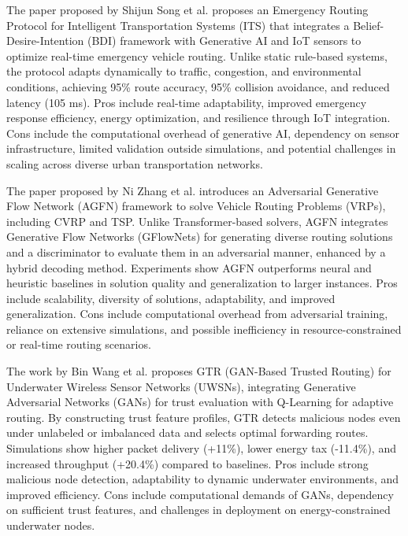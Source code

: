 \documentclass[a4paper,fleqn]{cas-dc}
\numberwithin{equation}{section}
\begin{document}
The paper proposed by Shijun Song et al.\cite{song2025emergency} proposes an Emergency Routing Protocol for Intelligent Transportation Systems (ITS) that integrates a Belief-Desire-Intention (BDI) framework with Generative AI and IoT sensors to optimize real-time emergency vehicle routing. Unlike static rule-based systems, the protocol adapts dynamically to traffic, congestion, and environmental conditions, achieving 95\% route accuracy, 95\% collision avoidance, and reduced latency (105 ms). Pros include real-time adaptability, improved emergency response efficiency, energy optimization, and resilience through IoT integration. Cons include the computational overhead of generative AI, dependency on sensor infrastructure, limited validation outside simulations, and potential challenges in scaling across diverse urban transportation networks. 

The paper proposed by Ni Zhang et al.\cite{zhang2025adversarial} introduces an Adversarial Generative Flow Network (AGFN) framework to solve Vehicle Routing Problems (VRPs), including CVRP and TSP. Unlike Transformer-based solvers, AGFN integrates Generative Flow Networks (GFlowNets) for generating diverse routing solutions and a discriminator to evaluate them in an adversarial manner, enhanced by a hybrid decoding method. Experiments show AGFN outperforms neural and heuristic baselines in solution quality and generalization to larger instances. Pros include scalability, diversity of solutions, adaptability, and improved generalization. Cons include computational overhead from adversarial training, reliance on extensive simulations, and possible inefficiency in resource-constrained or real-time routing scenarios.

The work by Bin Wang et al. \cite{wang2024gtr} proposes GTR (GAN-Based Trusted Routing) for Underwater Wireless Sensor Networks (UWSNs), integrating Generative Adversarial Networks (GANs) for trust evaluation with Q-Learning for adaptive routing. By constructing trust feature profiles, GTR detects malicious nodes even under unlabeled or imbalanced data and selects optimal forwarding routes. Simulations show higher packet delivery (+11\%), lower energy tax (-11.4\%), and increased throughput (+20.4\%) compared to baselines. Pros include strong malicious node detection, adaptability to dynamic underwater environments, and improved efficiency. Cons include computational demands of GANs, dependency on sufficient trust features, and challenges in deployment on energy-constrained underwater nodes.
\end{document}

